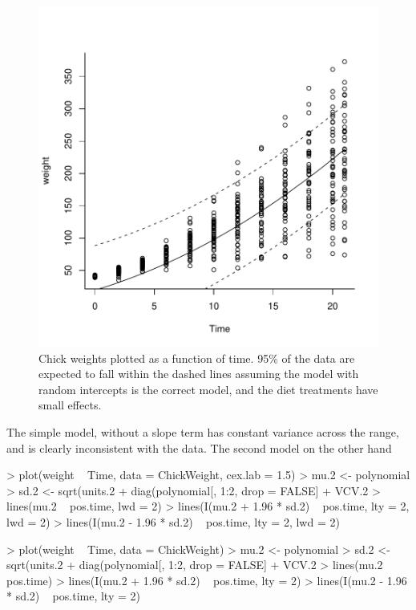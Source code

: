 \documentclass{article}
\begin{document}
\begin{figure}[!h]
\begin{center}
\includegraphics{Lecture4-034}
\end{center}
\caption{Chick weights plotted as a function of time. 95\% of the data are expected to fall within the dashed lines assuming the model with random intercepts is the correct model, and the diet treatments have small effects.}
\label{VCVpred.1-fig}
\end{figure}

The simple model, without a slope term has constant variance across the range, and is clearly inconsistent with the data. The second model on the other hand

\iftalk
\begin{Schunk}
\begin{Sinput}
> plot(weight ~ Time, data = ChickWeight, cex.lab = 1.5)
> mu.2 <- polynomial %
> sd.2 <- sqrt(units.2 + diag(polynomial[, 1:2, drop = FALSE] %
+     VCV.2 %
> lines(mu.2 ~ pos.time, lwd = 2)
> lines(I(mu.2 + 1.96 * sd.2) ~ pos.time, lty = 2, lwd = 2)
> lines(I(mu.2 - 1.96 * sd.2) ~ pos.time, lty = 2, lwd = 2)
\end{Sinput}
\end{Schunk}
\else
\begin{Schunk}
\begin{Sinput}
> plot(weight ~ Time, data = ChickWeight)
> mu.2 <- polynomial %
> sd.2 <- sqrt(units.2 + diag(polynomial[, 1:2, drop = FALSE] %
+     VCV.2 %
> lines(mu.2 ~ pos.time)
> lines(I(mu.2 + 1.96 * sd.2) ~ pos.time, lty = 2)
> lines(I(mu.2 - 1.96 * sd.2) ~ pos.time, lty = 2)
\end{Sinput}
\end{Schunk}
\fi
\end{document}
